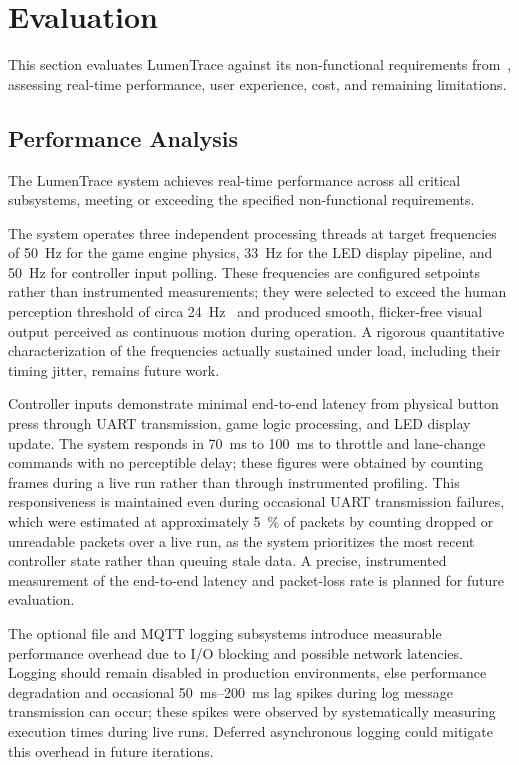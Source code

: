\documentclass[10pt,journal,final,a4paper]{IEEEtran}
\begin{document}
\section{Evaluation}
\label{sec:evaluation}

This section evaluates LumenTrace against its non-functional requirements from~, assessing real-time performance, user experience, cost, and remaining limitations.

\subsection{Performance Analysis}
\label{subsec:performance-analysis}

The LumenTrace system achieves real-time performance across all critical subsystems, meeting or exceeding the specified non-functional requirements.

The system operates three independent processing threads at target frequencies of \SI{50}{\hertz} for the game engine physics, \SI{33}{\hertz} for the LED display pipeline, and \SI{50}{\hertz} for controller input polling. These frequencies are configured setpoints rather than instrumented measurements; they were selected to exceed the human perception threshold of circa \SI{24}{\hertz}~\cite{chen:2007review,pazhoohi:2021effect} and produced smooth, flicker-free visual output perceived as continuous motion during operation. A rigorous quantitative characterization of the frequencies actually sustained under load, including their timing jitter, remains future work.

Controller inputs demonstrate minimal end-to-end latency from physical button press through UART transmission, game logic processing, and LED display update. The system responds in \SI{70}{\milli\second} to \SI{100}{\milli\second} to throttle and lane-change commands with no perceptible delay; these figures were obtained by counting frames during a live run rather than through instrumented profiling. This responsiveness is maintained even during occasional UART transmission failures, which were estimated at approximately \SI{5}{\percent} of packets by counting dropped or unreadable packets over a live run, as the system prioritizes the most recent controller state rather than queuing stale data. A precise, instrumented measurement of the end-to-end latency and packet-loss rate is planned for future evaluation.

The optional file and MQTT logging subsystems introduce measurable performance overhead due to I/O blocking and possible network latencies. Logging should remain disabled in production environments, else performance degradation and occasional \SI{50}{\milli\second}--\SI{200}{\milli\second} lag spikes during log message transmission can occur; these spikes were observed by systematically measuring execution times during live runs. Deferred asynchronous logging could mitigate this overhead in future iterations.
\end{document}
